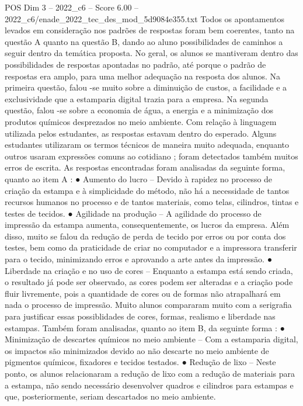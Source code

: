 \begin{textsample}{POS Dim 3 – 2022\_c6 – Score 6.00 – 2022\_c6/enade\_2022\_tec\_des\_mod\_5d9084e355.txt}
Todos os apontamentos levados em consideração nos padrões de respostas foram bem coerentes, tanto na questão A quanto na questão B, dando ao aluno possibilidades de caminhos a seguir dentro da temática proposta.
No geral, os alunos se mantiveram dentro das possibilidades de respostas apontadas no padrão, até porque o padrão de respostas era amplo, para uma melhor adequação na resposta dos alunos.
Na primeira questão, falou -se muito sobre a diminuição de custos, a facilidade e a exclusividade que a estamparia digital trazia para a empresa.
Na segunda questão, falou -se sobre a economia de água, a energia e a minimização dos produtos químicos desprezados no meio ambiente.
Com relação à linguagem utilizada pelos estudantes, as respostas estavam dentro do esperado.
Alguns estudantes utilizaram os termos técnicos de maneira muito adequada, enquanto outros usaram expressões comuns ao cotidiano ; foram detectados também muitos erros de escrita.
As respostas encontradas foram analisadas da seguinte forma, quanto ao item A : {\EmojiFont ●} Aumento do lucro – Devido à rapidez no processo de criação da estampa e à simplicidade do método, não há a necessidade de tantos recursos humanos no processo e de tantos materiais, como telas, cilindros, tintas e testes de tecidos. {\EmojiFont ●} Agilidade na produção – A agilidade do processo de impressão da estampa aumenta, consequentemente, os lucros da empresa.
Além disso, muito se falou da redução de perda de tecido por erros ou por conta dos testes, bem como da praticidade de criar no computador e a impressora transferir para o tecido, minimizando erros e aprovando a arte antes da impressão. {\EmojiFont ●} Liberdade na criação e no uso de cores – Enquanto a estampa está sendo criada, o resultado já pode ser observado, as cores podem ser alteradas e a criação pode fluir livremente, pois a quantidade de cores ou de formas não atrapalhará em nada o processo de impressão.
Muito alunos compararam muito com a serigrafia para justificar essas possiblidades de cores, formas, realismo e liberdade nas estampas.
Também foram analisadas, quanto ao item B, da seguinte forma : {\EmojiFont ●} Minimização de descartes químicos no meio ambiente – Com a estamparia digital, os impactos são minimizados devido ao não descarte no meio ambiente de pigmentos químicos, fixadores e tecidos testados. {\EmojiFont ●} Redução de lixo – Neste ponto, os alunos relacionaram a redução de lixo com a redução de materiais para a estampa, não sendo necessário desenvolver quadros e cilindros para estampas e que, posteriormente, seriam descartados no meio ambiente.

\end{textsample}
